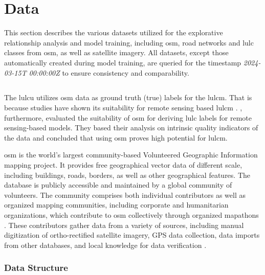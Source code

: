 \section{Data}

This section describes the various datasets utilized for the explorative relationship analysis and model training, including \gls{osm}, road networks and \gls{lulc} classes from \gls{osm}, as well as satellite imagery. All datasets, except those automatically created during model training, are queried for the timestamp \emph{2024-03-15T 00:00:00Z} to ensure consistency and comparability.

\subsection{}
\label{subsec:osm}

The \gls{lulcu} utilizes \gls{osm} data as ground truth (true) labels for the \gls{lulcm}. That is because studies have shown its suitability for remote sensing based \gls{lulcm} \autocite{Usmani.Napolitano.ea2023,Yang.Fu.ea2017}. \textcite{Schott.Zell.ea2024}, furthermore, evaluated the suitability of \gls{osm} for deriving \gls{lulc} labels for remote sensing-based models. They based their analysis on intrinsic quality indicators of the data and concluded that using \gls{osm} proves high potential for \gls{lulcm}.

\gls{osm} is the world's largest community-based Volunteered Geographic Information mapping project. It provides free geographical vector data of different scale, including buildings, roads, borders, as well as other geographical features. The database is publicly accessible and maintained by a global community of volunteers. The community comprises both individual contributors as well as organized mapping communities, including corporate and humanitarian organizations, which contribute to \gls{osm} collectively through organized mapathons \autocite{Anderson.Sarkar.ea2019,Herfort.Lautenbach.ea2021}. These contributors gather data from a variety of sources, including manual digitization of ortho-rectified satellite imagery, GPS data collection, data imports from other databases, and local knowledge for data verification \autocite{Usmani.Napolitano.ea2023}.

\subsubsection*{Data Structure}

